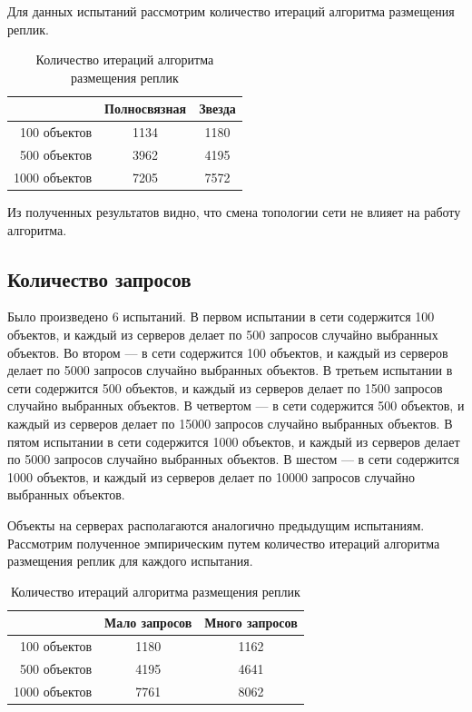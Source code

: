 			Для данных испытаний рассмотрим количество итераций алгоритма размещения реплик.

			\begin{table}[H]
				\small
				\centering
				\caption{Количество итераций алгоритма размещения реплик}
				\begin{tabular} {|r|c|c|}
					\hline
						& Полносвязная 	& Звезда \\
					\hline
	100 объектов		& 1134			& 1180   \\
	500 объектов		& 3962			& 4195   \\
	1000 объектов		& 7205			& 7572   \\
					\hline
				\end{tabular}
			\end{table}

			Из полученных результатов видно, что смена топологии сети не влияет на работу алгоритма.
			
		\subsection{Количество запросов}
			Было произведено 6 испытаний. В первом испытании в сети содержится 100 объектов, и каждый из серверов делает по 500 запросов случайно выбранных объектов. Во втором --- в сети 
			содержится 100 объектов, и каждый из серверов делает по 5000 запросов случайно выбранных объектов. В третьем испытании в сети содержится 500 объектов, и каждый из серверов делает 
			по 1500 запросов случайно выбранных объектов. В четвертом --- в сети содержится 500 объектов, и каждый из серверов делает по 15000 запросов случайно выбранных объектов. В пятом 
			испытании в сети содержится 1000 объектов, и каждый из серверов делает по 5000 запросов случайно выбранных объектов. В шестом --- в сети содержится 1000 объектов, и каждый из серверов 
			делает по 10000 запросов случайно выбранных объектов.
			
			Объекты на серверах располагаются аналогично предыдущим испытаниям. Рассмотрим полученное эмпирическим путем количество итераций алгоритма размещения реплик для каждого испытания.

			\begin{table}[H]
				\small
				\centering
				\caption{Количество итераций алгоритма размещения реплик}
				\begin{tabular} {|r|c|c|}
					\hline
						& Мало запросов & Много запросов \\
					\hline
	100 объектов		& 1180			& 1162 \\
	500 объектов		& 4195			& 4641 \\
	1000 объектов		& 7761			& 8062 \\
					\hline
				\end{tabular}
			\end{table}

